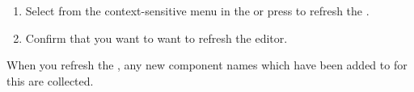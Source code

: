 
\begin{enumerate}
\item Select  from the context-sensitive menu in the \gdomeditor{} or press  to refresh the \gdomeditor{}. 
\item Confirm that you want to want to refresh the editor. 
\end{enumerate}

When you refresh the \gdomeditor{}, any new component names which have been added to \gdsuites{} for this \gdaut{} are collected. 

